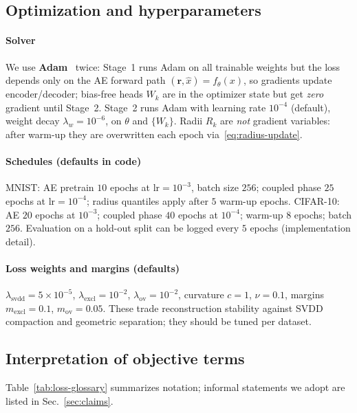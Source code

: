 \documentclass[conference]{IEEEtran}
\begin{document}
\subsection{Optimization and hyperparameters}\label{sec:optim}
\paragraph{Solver}
We use \textbf{Adam}~\cite{kingma2014adam} twice: Stage~1 runs Adam on all trainable weights but the loss depends only on the AE forward path $(\mathbf{r},\hat x)=f_\theta(x)$, so gradients update encoder/decoder; bias-free heads $W_k$ are in the optimizer state but get \emph{zero} gradient until Stage~2.
Stage~2 runs Adam with learning rate $10^{-4}$ (default), weight decay $\lambda_w{=}10^{-6}$, on $\theta$ and $\{W_k\}$.
Radii $R_k$ are \emph{not} gradient variables: after warm-up they are overwritten each epoch via~\eqref{eq:radius-update}.

\paragraph{Schedules (defaults in code)}
MNIST: AE pretrain $10$ epochs at $\text{lr}{=}10^{-3}$, batch size $256$; coupled phase $25$ epochs at $\text{lr}{=}10^{-4}$; radius quantiles apply after $5$ warm-up epochs.
CIFAR-10: AE $20$ epochs at $10^{-3}$; coupled phase $40$ epochs at $10^{-4}$; warm-up $8$ epochs; batch $256$.
Evaluation on a hold-out split can be logged every $5$ epochs (implementation detail).

\paragraph{Loss weights and margins (defaults)}
$\lambda_{\text{svdd}}{=}5{\times}10^{-5}$, $\lambda_{\text{excl}}{=}10^{-2}$, $\lambda_{\text{ov}}{=}10^{-2}$, curvature $c{=}1$, $\nu{=}0.1$, margins $m_{\text{excl}}{=}0.1$, $m_{\text{ov}}{=}0.05$.
These trade reconstruction stability against SVDD compaction and geometric separation; they should be tuned per dataset.

\subsection{Interpretation of objective terms}\label{sec:glossary}
Table~\ref{tab:loss-glossary} summarizes notation; informal statements we adopt are listed in Sec.~\ref{sec:claims}.
\end{document}
